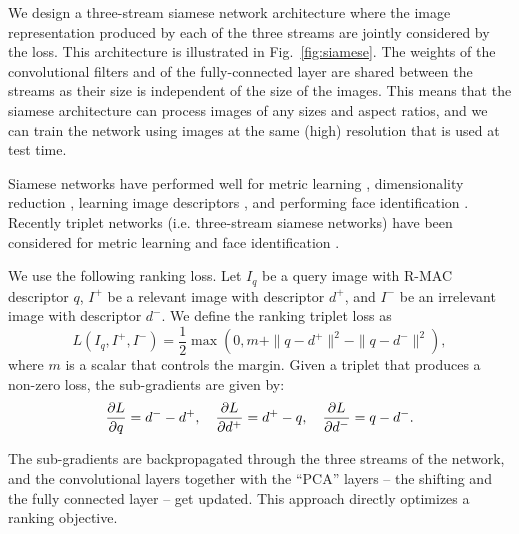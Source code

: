 \documentclass[twocolumn]{svjour3}          \smartqed  \usepackage{graphicx}
\begin{document}
We design a three-stream siamese network architecture where the image representation produced by each of the three streams are jointly considered by the loss. This architecture is illustrated in Fig.~\ref{fig:siamese}. The weights of the convolutional filters and of the fully-connected layer are shared between the  streams as their size is independent of the size of the images. This means that the siamese architecture can process images of any sizes and aspect ratios, and we can train the network using images at the same (high) resolution that is used at test time. 

Siamese networks have performed well for metric learning \citep{Song2015}, dimensionality reduction \citep{Hadsell2006}, learning image descriptors \citep{Serra2015}, and performing face identification \citep{Chopra2005,Hu2014,Sun2014}. Recently triplet networks (i.e. three-stream siamese networks) have been considered for metric learning \citep{Hoffer2015,Wang2014} and face identification \citep{SchroffK2015}. 

We use the following ranking loss. Let $I_q$ be a query image with R-MAC descriptor $q$, $I^+$ be a relevant image with descriptor $d^+$, and $I^-$ be an irrelevant image with descriptor $d^-$.
We define the ranking triplet loss as
\begin{equation}\label{eq:loss}
L(I_q,I^+,I^-) = \frac{1}{2} \max (0, m + \|q-d^+\|^2 - \|q-d^-\|^2),
\end{equation}
where $m$ is a scalar that controls the margin. 
Given a triplet that produces a non-zero loss, the sub-gradients are given by:
\begin{equation}\label{eq:grad}
    \centering
    \frac{\partial L}{\partial q} = d^- - d^+, \quad 
    \frac{\partial L}{\partial d^+} = d^+ - q, \quad 
    \frac{\partial L}{\partial d^-} = q - d^-. 
\end{equation}

The sub-gradients are backpropagated through the three streams of the
network, and the convolutional layers together with the ``PCA'' layers -- the shifting and the fully connected layer -- get updated.
This approach directly optimizes a ranking objective.
\end{document}
